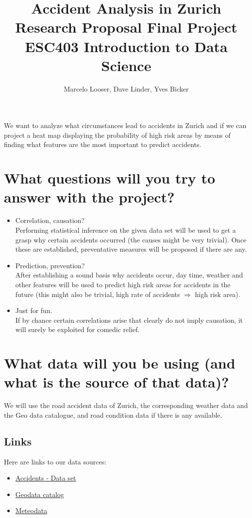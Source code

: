 \documentclass{article}
\title{Accident Analysis in Zurich\\
\large Research Proposal Final Project\\
ESC403 Introduction to Data Science}
\author{Marcelo Looser, Dave Linder, Yves Bicker}
\begin{document}
\maketitle

\noindent
We want to analyze what circumstances lead to accidents in Zurich and if we can project a heat map displaying the probability of high risk areas by means of finding what features are the most important to predict accidents.

\section*{What questions will you try to answer with the project?}
\begin{itemize}
    \item Correlation, causation?\vspace{0.2cm}\\
     Performing statistical inference on the given data set will be used to get a grasp why certain accidents occurred (the causes might be very trivial). Once these are established, preventative measures will be proposed if there are any. 
     
    \item Prediction, prevention? \vspace{0.2cm}\\
    After establishing a sound basis why accidents occur, day time, weather and other features will be used to predict high risk areas for accidents in the future (this might also be trivial, high rate of accidents $\Rightarrow$ high risk area). 
    
    \item Just for fun. \vspace{0.2cm}\\
    If by chance certain correlations arise that clearly do not imply causation, it will surely be exploited for comedic relief.  
\end{itemize}

\section*{What data will you be using (and what is the source of that data)?}
We will use the road accident data of Zurich, the corresponding weather data and the Geo data catalogue, and road condition data if there is any available.

\subsection*{Links}
Here are links to our data sources:
\begin{itemize}
    \item \href{https://opendata.swiss/de/dataset/polizeilich-registrierte-verkehrsunfalle-auf-dem-stadtgebiet-zurich-seit-2011/resource/3bf3f12a-bf09-4e69-8cde-0df9e268d54b}{Accidents - Data set}
    \item \href{https://maps.zh.ch/}{Geodata catalog}
    \item \href{https://data.stadt-zuerich.ch/dataset/ugz_meteodaten_stundenmittelwerte}{Meteodata}
\end{itemize}
\end{document}
